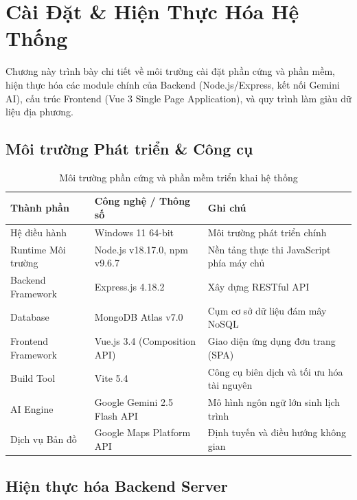 \chapter{Cài Đặt \& Hiện Thực Hóa Hệ Thống}

\begin{muctieu}
Chương này trình bày chi tiết về môi trường cài đặt phần cứng và phần mềm, hiện thực hóa các module chính của Backend (Node.js/Express, kết nối Gemini AI), cấu trúc Frontend (Vue 3 Single Page Application), và quy trình làm giàu dữ liệu địa phương.
\end{muctieu}

\section{Môi trường Phát triển \& Công cụ}

\begin{table}[H]
\centering
\caption{Môi trường phần cứng và phần mềm triển khai hệ thống}
\begin{tabular}{|l|l|p{7.5cm}|}
\hline
\textbf{Thành phần} & \textbf{Công nghệ / Thông số} & \textbf{Ghi chú} \\ \hline
Hệ điều hành & Windows 11 64-bit & Môi trường phát triển chính \\ \hline
Runtime Môi trường & Node.js v18.17.0, npm v9.6.7 & Nền tảng thực thi JavaScript phía máy chủ \\ \hline
Backend Framework & Express.js 4.18.2 & Xây dựng RESTful API \\ \hline
Database & MongoDB Atlas v7.0 & Cụm cơ sở dữ liệu đám mây NoSQL \\ \hline
Frontend Framework & Vue.js 3.4 (Composition API) & Giao diện ứng dụng đơn trang (SPA) \\ \hline
Build Tool & Vite 5.4 & Công cụ biên dịch và tối ưu hóa tài nguyên \\ \hline
AI Engine & Google Gemini 2.5 Flash API & Mô hình ngôn ngữ lớn sinh lịch trình \\ \hline
Dịch vụ Bản đồ & Google Maps Platform API & Định tuyến và điều hướng không gian \\ \hline
\end{tabular}
\end{table}

\section{Hiện thực hóa Backend Server}

